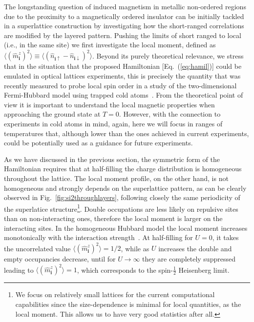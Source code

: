 \documentclass[aps,pra,reprint,twocolumn,showpacs,longbibliography,superscriptaddress]{revtex4-1}
\begin{document}
The longstanding question of induced magnetism in metallic non-ordered regions due to the proximity to a magnetically ordered insulator can be initially tackled in a superlattice construction by investigating how the short-ranged correlations are modified by the layered pattern. Pushing the limits of short ranged to local (i.e., in the same site) we first investigate the local moment, defined as $\langle \left(\hat m_\mathbf{i}^z\right)^2\rangle \equiv \langle \left( \hat n_{\mathbf{i}\uparrow}-\hat n_{\mathbf{i}\downarrow}\right)^2\rangle$. Beyond its purely theoretical relevance, we stress that in the situation that the proposed Hamiltonian [Eq.~(\ref{eq:hamil})] could be emulated in optical lattices experiments, this is precisely the quantity that was recently measured to probe local spin order in a study of the two-dimensional Fermi-Hubbard model using trapped cold atoms~\cite{Cheuk1260}.   
From the theoretical point of view it is important to understand the local magnetic properties when approaching the ground state at $T=0$. However, with the connection to experiments in cold atoms in mind, again,  
here we will focus in ranges of temperatures that, although lower than the ones achieved in current experiments, could be potentially used as a guidance for future experiments.

As we have discussed in the previous section, the symmetric form of the Hamiltonian requires that at half-filling the charge distribution is homogeneous throughout the lattice.  The local moment profile, on the other hand, is not homogeneous and strongly depends on the superlattice pattern, as can be clearly observed in Fig.~\ref{fig:si2throughlayers}, following closely the same periodicity of the superlatice structure\footnote{We focus on relatively small lattices for the current computational capabilities since the size-dependence is minimal for local quantities, as the local moment. This allows us to have very good statistics after all.}. Double occupations are less likely on repulsive sites than on non-interacting ones, therefore the local moment is larger on the interacting sites. In the homogeneous Hubbard model the local moment  increases monotonically  with the interaction strength~\cite{Hirsch85}. At half-filling for $U=0$, it takes the uncorrelated value $\langle \left(\hat m_\mathbf{i}^z\right)^2\rangle=1/2$, while as $U$ increases the double and empty occupancies decrease, until for $U\rightarrow\infty$ they are completely suppressed leading to $\langle \left(\hat m_\mathbf{i}^z\right)^2\rangle=1$, which corresponds to the spin-$\frac{1}{2}$ Heisenberg limit.
\end{document}

